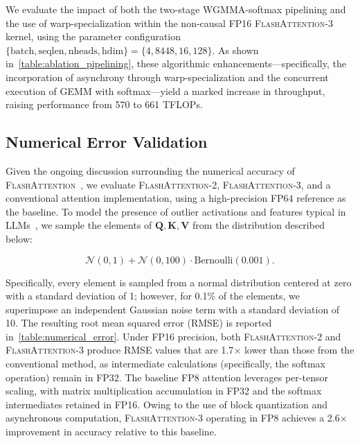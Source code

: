 \begin{enumerate}
We evaluate the impact of both the two-stage WGMMA-softmax pipelining and the use of warp-specialization within the non-causal FP16 \textsc{FlashAttention-3} kernel, using the parameter configuration $\{\text{batch}, \text{seqlen}, \text{nheads}, \text{hdim}\} = \{ 4, 8448, 16, 128\}$. As shown in~\cref{table:ablation_pipelining}, these algorithmic enhancements—specifically, the incorporation of asynchrony through warp-specialization and the concurrent execution of GEMM with softmax—yield a marked increase in throughput, raising performance from 570 to 661 TFLOPs.

\subsection{Numerical Error Validation}
\label{sec:numerical_error}

Given the ongoing discussion surrounding the numerical accuracy of \textsc{FlashAttention}~\citep{golden2024flash}, we evaluate \textsc{FlashAttention-2}, \textsc{FlashAttention-3}, and a conventional attention implementation, using a high-precision FP64 reference as the baseline. To model the presence of outlier activations and features typical in LLMs~\citep{dettmers2208llm, sun2024massive}, we sample the elements of $\mathbf{Q}, \mathbf{K}, \mathbf{V}$ from the distribution described below:

\begin{equation*}
  \mathcal{N}(0, 1) + \mathcal{N}(0, 100) \cdot \mathrm{Bernoulli}(0.001).
\end{equation*}

Specifically, every element is sampled from a normal distribution centered at zero with a standard deviation of 1; however, for 0.1\% of the elements, we superimpose an independent Gaussian noise term with a standard deviation of 10. The resulting root mean squared error (RMSE) is reported in~\cref{table:numerical_error}. Under FP16 precision, both \textsc{FlashAttention-2} and \textsc{FlashAttention-3} produce RMSE values that are 1.7$\times$ lower than those from the conventional method, as intermediate calculations (specifically, the softmax operation) remain in FP32. The baseline FP8 attention leverages per-tensor scaling, with matrix multiplication accumulation in FP32 and the softmax intermediates retained in FP16. Owing to the use of block quantization and asynchronous computation, \textsc{FlashAttention-3} operating in FP8 achieves a 2.6$\times$ improvement in accuracy relative to this baseline.


\end{enumerate}
